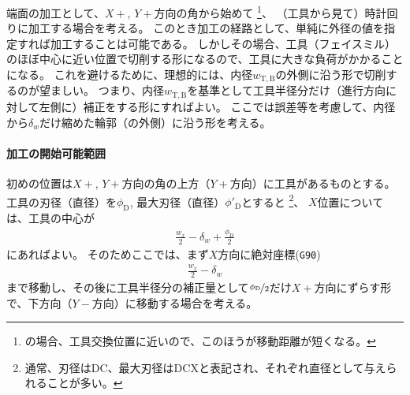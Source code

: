 \clearpage
端面の加工として、$X+$, $Y+$方向の角から始めて
\footnote{\DMname の場合、工具交換位置に近いので、このほうが移動距離が短くなる。}、
（工具から見て）時計回りに加工する場合を考える。
このとき加工の経路として、単純に外径の値を指定すれば加工することは可能である。
しかしその場合、工具（フェイスミル）のほぼ中心に近い位置で切削する形になるので、工具に大きな負荷がかかることになる。
これを避けるために、理想的には、内径$w_{\mathrm T, \mathrm B}$の外側に沿う形で切削するのが望ましい。
つまり、内径$w_{\mathrm T, \mathrm B}$を基準として工具半径分だけ（進行方向に対して左側に）補正をする形にすればよい。
ここでは誤差等を考慮して、内径から$\delta_w$だけ縮めた輪郭（の外側）に沿う形を考える。



\paragraph*{加工の開始可能範囲}\noindent
初めの位置は$X+$, $Y+$方向の角の上方（$Y+$方向）に工具があるものとする。
工具の刃径（直径）を$\phi_\mathrm D$, 最大刃径（直径）$\phi'_\mathrm D$とすると
\footnote{通常、刃径はDC、最大刃径はDCXと表記され、それぞれ直径として与えられることが多い。}、
$X$位置については、工具の中心が
\begin{align}
  \label{eq:tanmenKakouStartX}
  \frac{w_x}2-\delta_w+\frac{\phi_\mathrm D}2
\end{align}
にあればよい。
そのためここでは、まず$X$方向に絶対座標(\verb|G90|)
\begin{align*}
  \frac{w_x}2-\delta_w
\end{align*}
まで移動し、その後に工具半径分の補正量として$\nicefrac{\phi_\mathrm D}2$だけ$X+$方向にずらす形で、下方向（$Y-$方向）に移動する場合を考える。



